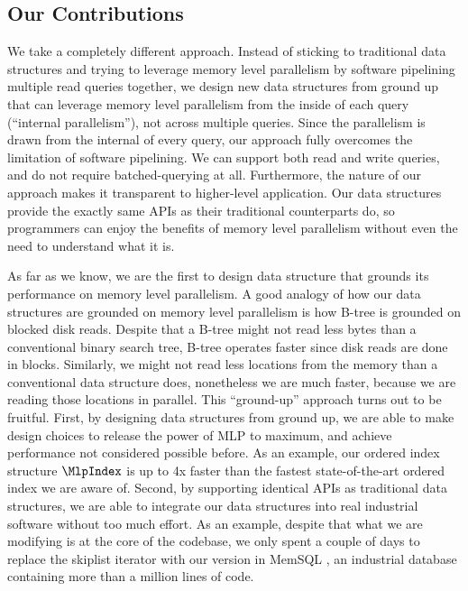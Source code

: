 \documentclass[11pt, usletter]{article}
\begin{document}
\subsection{Our Contributions}

We take a completely different approach. 
Instead of sticking to traditional data structures 
and trying to leverage memory level parallelism by software pipelining multiple read queries together, 
we design new data structures from ground up that can leverage memory level parallelism 
from the inside of each query (``internal parallelism''), not across multiple queries. 
Since the parallelism is drawn from the internal of every query, 
our approach fully overcomes the limitation of software pipelining.
We can support both read and write queries, and do not require batched-querying at all. 
Furthermore, the nature of our approach makes it transparent to higher-level application. 
Our data structures provide the exactly same APIs as their traditional counterparts do, 
so programmers can enjoy the benefits of memory level parallelism without even the need to understand what it is.

As far as we know, we are the first to design data structure that grounds its performance on memory level parallelism.
A good analogy of how our data structures are grounded on memory level parallelism 
is how B-tree is grounded on blocked disk reads. 
Despite that a B-tree might not read less bytes than a conventional binary search tree, 
B-tree operates faster since disk reads are done in blocks. 
Similarly, we might not read less locations from the memory than a conventional data structure does, 
nonetheless we are much faster, because we are reading those locations in parallel.
This ``ground-up'' approach turns out to be fruitful. 
First, by designing data structures from ground up, 
we are able to make design choices to release the power of MLP to maximum, 
and achieve performance not considered possible before. 
As an example, our ordered index structure $\MlpIndex$ is up to 4x faster 
than the fastest state-of-the-art ordered index we are aware of.
Second, by supporting identical APIs as traditional data structures, 
we are able to integrate our data structures into real industrial software 
without too much effort. 
As an example, despite that what we are modifying is at the core of the codebase,
we only spent a couple of days to replace the skiplist iterator with our version in MemSQL \cite{memsql}, 
an industrial database containing more than a million lines of code.
\end{document}
